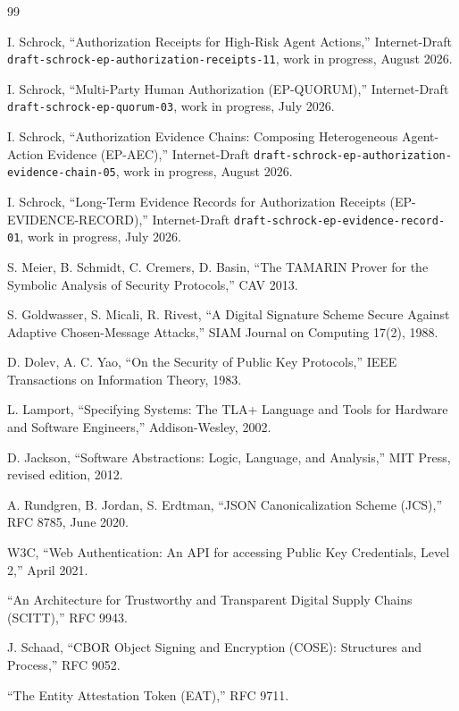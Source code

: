 \documentclass[11pt]{article}
\newcommand{\code}[1]{\texttt{#1}}
\begin{document}
\begin{thebibliography}{99}

 I. Schrock, ``Authorization Receipts for High-Risk Agent Actions,''
Internet-Draft \code{draft-schrock-ep-authorization-receipts-11}, work in progress,
August 2026.

 I. Schrock, ``Multi-Party Human Authorization (EP-QUORUM),''
Internet-Draft \code{draft-schrock-ep-quorum-03}, work in progress, July 2026.

 I. Schrock, ``Authorization Evidence Chains: Composing Heterogeneous
Agent-Action Evidence (EP-AEC),'' Internet-Draft
\code{draft-schrock-ep-authorization-evidence-chain-05}, work in progress, August
2026.

 I. Schrock, ``Long-Term Evidence Records for Authorization Receipts
(EP-EVIDENCE-RECORD),'' Internet-Draft \code{draft-schrock-ep-evidence-record-01},
work in progress, July 2026.

 S. Meier, B. Schmidt, C. Cremers, D. Basin, ``The TAMARIN Prover
for the Symbolic Analysis of Security Protocols,'' CAV 2013.

 S. Goldwasser, S. Micali, R. Rivest, ``A Digital Signature Scheme
Secure Against Adaptive Chosen-Message Attacks,'' SIAM Journal on Computing 17(2),
1988.

 D. Dolev, A. C. Yao, ``On the Security of Public Key Protocols,'' IEEE
Transactions on Information Theory, 1983.

 L. Lamport, ``Specifying Systems: The TLA+ Language and Tools for
Hardware and Software Engineers,'' Addison-Wesley, 2002.

 D. Jackson, ``Software Abstractions: Logic, Language, and
Analysis,'' MIT Press, revised edition, 2012.

 A. Rundgren, B. Jordan, S. Erdtman, ``JSON Canonicalization Scheme
(JCS),'' RFC 8785, June 2020.

 W3C, ``Web Authentication: An API for accessing Public Key
Credentials, Level 2,'' April 2021.

 ``An Architecture for Trustworthy and Transparent Digital Supply
Chains (SCITT),'' RFC 9943.

 J. Schaad, ``CBOR Object Signing and Encryption (COSE): Structures
and Process,'' RFC 9052.

 ``The Entity Attestation Token (EAT),'' RFC 9711.


\end{thebibliography}
\end{document}
